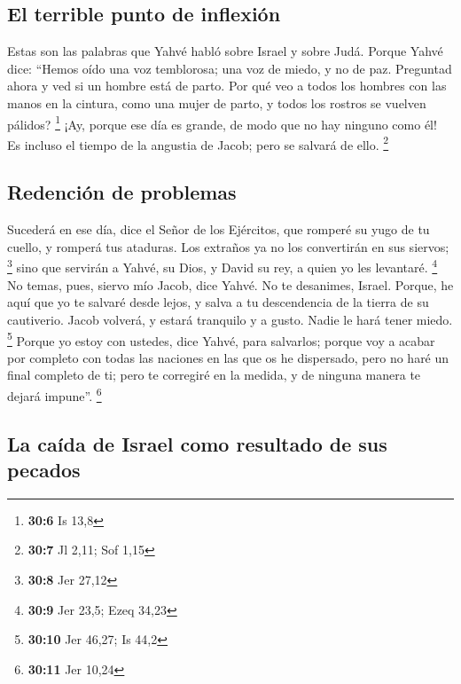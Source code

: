 \hypertarget{el-terrible-punto-de-inflexiuxf3n}{%
\subsection{El terrible punto de
inflexión}\label{el-terrible-punto-de-inflexiuxf3n}}

 Estas son las palabras que Yahvé habló sobre Israel y
sobre Judá.  Porque Yahvé dice: ``Hemos oído una voz
temblorosa; una voz de miedo, y no de paz.  Preguntad
ahora y ved si un hombre está de parto. Por qué veo a todos los hombres
con las manos en la cintura, como una mujer de parto, y todos los
rostros se vuelven pálidos? \footnote{\textbf{30:6} Is 13,8}
 ¡Ay, porque ese día es grande, de modo que no hay ninguno
como él! Es incluso el tiempo de la angustia de Jacob; pero se salvará
de ello. \footnote{\textbf{30:7} Jl 2,11; Sof 1,15}

\hypertarget{redenciuxf3n-de-problemas}{%
\subsection{Redención de problemas}\label{redenciuxf3n-de-problemas}}

 Sucederá en ese día, dice el Señor de los Ejércitos, que
romperé su yugo de tu cuello, y romperá tus ataduras. Los extraños ya no
los convertirán en sus siervos; \footnote{\textbf{30:8} Jer 27,12}
 sino que servirán a Yahvé, su Dios, y David su rey, a
quien yo les levantaré. \footnote{\textbf{30:9} Jer 23,5; Ezeq 34,23}
 No temas, pues, siervo mío Jacob, dice Yahvé. No te
desanimes, Israel. Porque, he aquí que yo te salvaré desde lejos, y
salva a tu descendencia de la tierra de su cautiverio. Jacob volverá, y
estará tranquilo y a gusto. Nadie le hará tener miedo. \footnote{\textbf{30:10}
  Jer 46,27; Is 44,2}  Porque yo estoy con ustedes, dice
Yahvé, para salvarlos; porque voy a acabar por completo con todas las
naciones en las que os he dispersado, pero no haré un final completo de
ti; pero te corregiré en la medida, y de ninguna manera te dejará
impune''. \footnote{\textbf{30:11} Jer 10,24}

\hypertarget{la-cauxedda-de-israel-como-resultado-de-sus-pecados}{%
\subsection{La caída de Israel como resultado de sus
pecados}\label{la-cauxedda-de-israel-como-resultado-de-sus-pecados}}

